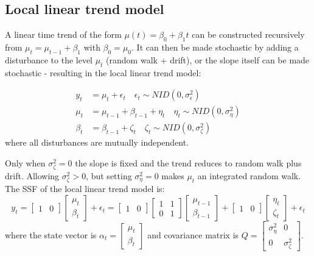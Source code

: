 \documentclass[DIV=14,titlepage=false]{scrreprt}
\begin{document}
\subsection{Local linear trend model}
A linear time trend of the form $\mu (t) = \beta_0 + \beta_1 t$ can be constructed recursively from $\mu_t = \mu_{t-1} + \beta_1$ with $\beta_0 = \mu_0$. It can then be made stochastic by adding a disturbance to the level $\mu_t$ (random walk + drift), or the slope itself can be made stochastic - resulting in the local linear trend model:
\begin{definition}
    \begin{align*}
        y_t &= \mu_t + \epsilon_t \quad \epsilon_t \sim NID(0,\sigma^2_\epsilon)\\
        \mu_t &= \mu_{t-1} + \beta_{t-1} + \eta_t \quad \eta_t \sim NID(0,\sigma^2_\eta)\\
        \beta_t &= \beta_{t-1} + \zeta_t \quad \zeta_t \sim NID(0,\sigma^2_\zeta)
    \end{align*}
    where all disturbances are mutually independent.
\end{definition}
Only when $\sigma^2_\zeta = 0$ the slope is fixed and the trend reduces to random walk plus drift. Allowing $\sigma^2_\zeta > 0$, but setting $\sigma^2_\eta = 0$ makes $\mu_t$ an integrated random walk.\\
The SSF of the local linear trend model is:
\[
    y_t = \begin{bmatrix} 1 & 0 \end{bmatrix} \begin{bmatrix} \mu_t \\ \beta_t \end{bmatrix} + \epsilon_t = \begin{bmatrix} 1 & 0 \end{bmatrix} \begin{bmatrix} 1 & 1 \\ 0 & 1 \end{bmatrix} \begin{bmatrix} \mu_{t-1} \\ \beta_{t-1} \end{bmatrix} + \begin{bmatrix} 1 & 0 \end{bmatrix} \begin{bmatrix} \eta_t \\ \zeta_t \end{bmatrix} + \epsilon_t
\]
where the state vector is $\alpha_t = \begin{bmatrix} \mu_t \\ \beta_t \end{bmatrix}$ and covariance matrix is $Q = \begin{bmatrix} \sigma^2_\eta & 0 \\ 0 & \sigma^2_\zeta \end{bmatrix}$.
\end{document}
